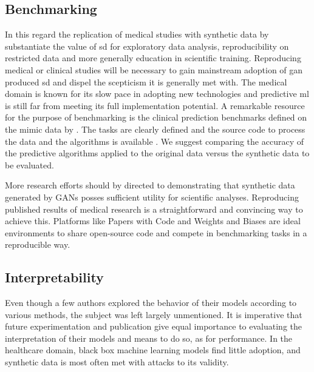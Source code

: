 \subsection{Benchmarking}
In this regard the replication of medical studies with synthetic data by \citeauthor{Yale_2020} substantiate the value of \gls{sd} for exploratory data analysis, reproducibility on restricted data and more generally education in scientific training. Reproducing medical or clinical studies will be necessary to gain mainstream adoption of \gls{gan} produced \gls{sd} and dispel the scepticism it is generally met with. The medical domain is known for its slow pace in adopting new technologies and predictive \gls{ml} is still far from meeting its full implementation potential.
A remarkable resource for the purpose of benchmarking is the clinical prediction benchmarks defined on the \gls{mimic} data by \citeauthor{harutyunyan_multitask_2019}. The tasks are clearly defined and the source code to process the data and the algorithms is available \cite{harutyunyan_multitask_2019}. We suggest comparing the accuracy of the predictive algorithms applied to the original data versus the synthetic data to be evaluated. 

\begin{tcolorbox}[sharp corners, colback=teal!10, colframe=teal!80, title=Increasing the focus on benchmarking and reproducibility]
More research efforts should by directed to demonstrating that synthetic data generated by GANs posses sufficient utility for scientific analyses. Reproducing published results of medical research is a straightforward and convincing way to achieve this. 
Platforms like Papers with Code \cite{papers_with_code} and Weights and Biases \cite{wandb} are ideal environments to share open-source code and compete in benchmarking tasks in a reproducible way.
\end{tcolorbox}

\subsection{Interpretability}
Even though a few authors explored the behavior of their models according to various methods, the subject was left largely unmentioned. It is imperative that future experimentation and publication give equal importance to evaluating the interpretation of their models and means to do so, as for performance. In the healthcare domain, black box machine learning models find little adoption, and synthetic data is most often met with attacks to its validity.

